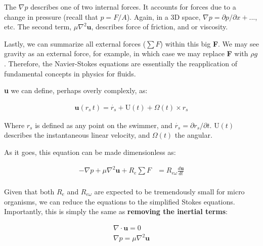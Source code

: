 The $\nabla p$ describes one of two internal forces. It accounts for forces due to a change in pressure (recall that $p = F/A$). Again, in a 3D space, $\nabla p = \partial p / \partial x + ... $, etc. The second term, $\mu \nabla^2\mathbf{u}$, describes force of friction, and or viscosity.\newline

Lastly, we can summarize all external forces ($\sum F$) within this big \textbf{F}. We may see gravity as an external force, for example, in which case we may replace \textbf{F} with $\rho g$. Therefore, the Navier-Stokes equations are essentially the reapplication of fundamental concepts in physics for fluids.\newline

\textbf{u} we can define, perhaps overly complexly, as:

\begin{equation} \label{NS3}
\begin{split}
\mathbf{u}(r_s\,t) = \dot{r_s} + \mathrm{U}(t) + \Omega(t)\times r_s
\end{split}
\end{equation}

Where $r_s$ is defined as any point on the swimmer, and $\dot{r_s} = \partial r_s / \partial t$. $\mathrm{U}(t)$ describes the instantaneous linear velocity, and $\Omega(t)$ the angular.\newline

As it goes, this equation can be made dimensionless as: 

\begin{equation} \label{NS4}
\begin{split}
-\nabla p + \mu \nabla^2\mathbf{u} + R_e\sum F & = R_{e\omega} \frac{d\mathbf{u}}{dt} \\
\end{split}
\end{equation}

Given that both $R_e$ and $R_{e\omega}$ are expected to be tremendously small for micro organisms, we can reduce the equations to the simplified Stokes equations. Importantly, this is simply the same as \textbf{removing the inertial terms}: 

\begin{equation} \label{S1}
\begin{split}
\nabla \cdot \mathbf{u} = 0 \\
\nabla p = \mu \nabla^2\mathbf{u} 
\end{split}
\end{equation}


